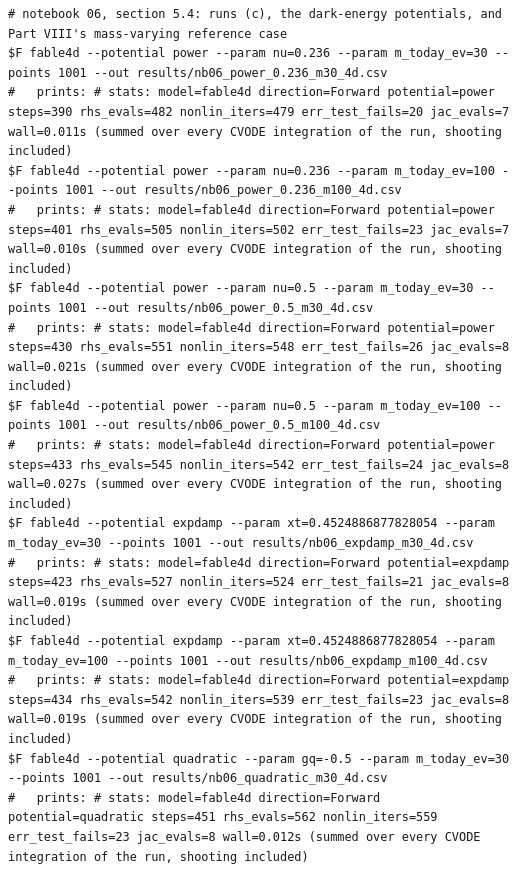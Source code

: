 \begin{Verbatim}[fontsize=\scriptsize]
# notebook 06, section 5.4: runs (c), the dark-energy potentials, and Part VIII's mass-varying reference case
$F fable4d --potential power --param nu=0.236 --param m_today_ev=30 --points 1001 --out results/nb06_power_0.236_m30_4d.csv
#   prints: # stats: model=fable4d direction=Forward potential=power steps=390 rhs_evals=482 nonlin_iters=479 err_test_fails=20 jac_evals=7 wall=0.011s (summed over every CVODE integration of the run, shooting included)
$F fable4d --potential power --param nu=0.236 --param m_today_ev=100 --points 1001 --out results/nb06_power_0.236_m100_4d.csv
#   prints: # stats: model=fable4d direction=Forward potential=power steps=401 rhs_evals=505 nonlin_iters=502 err_test_fails=23 jac_evals=7 wall=0.010s (summed over every CVODE integration of the run, shooting included)
$F fable4d --potential power --param nu=0.5 --param m_today_ev=30 --points 1001 --out results/nb06_power_0.5_m30_4d.csv
#   prints: # stats: model=fable4d direction=Forward potential=power steps=430 rhs_evals=551 nonlin_iters=548 err_test_fails=26 jac_evals=8 wall=0.021s (summed over every CVODE integration of the run, shooting included)
$F fable4d --potential power --param nu=0.5 --param m_today_ev=100 --points 1001 --out results/nb06_power_0.5_m100_4d.csv
#   prints: # stats: model=fable4d direction=Forward potential=power steps=433 rhs_evals=545 nonlin_iters=542 err_test_fails=24 jac_evals=8 wall=0.027s (summed over every CVODE integration of the run, shooting included)
$F fable4d --potential expdamp --param xt=0.4524886877828054 --param m_today_ev=30 --points 1001 --out results/nb06_expdamp_m30_4d.csv
#   prints: # stats: model=fable4d direction=Forward potential=expdamp steps=423 rhs_evals=527 nonlin_iters=524 err_test_fails=21 jac_evals=8 wall=0.019s (summed over every CVODE integration of the run, shooting included)
$F fable4d --potential expdamp --param xt=0.4524886877828054 --param m_today_ev=100 --points 1001 --out results/nb06_expdamp_m100_4d.csv
#   prints: # stats: model=fable4d direction=Forward potential=expdamp steps=434 rhs_evals=542 nonlin_iters=539 err_test_fails=23 jac_evals=8 wall=0.019s (summed over every CVODE integration of the run, shooting included)
$F fable4d --potential quadratic --param gq=-0.5 --param m_today_ev=30 --points 1001 --out results/nb06_quadratic_m30_4d.csv
#   prints: # stats: model=fable4d direction=Forward potential=quadratic steps=451 rhs_evals=562 nonlin_iters=559 err_test_fails=23 jac_evals=8 wall=0.012s (summed over every CVODE integration of the run, shooting included)

\end{Verbatim}
